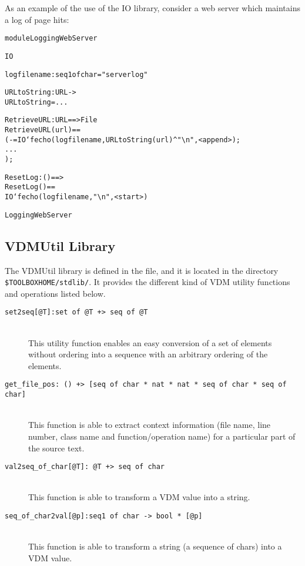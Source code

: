 \documentclass[\pformat,12pt]{article}
\begin{document}
As an example of the use of the IO library, consider a
web server which maintains a log of page hits:

\begin{alltt}
  module LoggingWebServer

       IO 

     


      logfilename : seq1 of char = "serverlog"

      URLtoString : URL ->   
      URLtoString = ...

      RetrieveURL : URL ==> File
      RetrieveURL(url) ==
        ( - = IO`fecho(logfilename, URLtoString(url)^\verb+"\n"+, <append>);
         ... 
        );

      ResetLog : () ==> 
      ResetLog() ==
        IO`fecho(logfilename,\verb+"\n"+,<start>)

   LoggingWebServer
\end{alltt}

\subsection{VDMUtil Library}

The VDMUtil library is defined in the 
 file, and it 
is located 
in the directory \verb+$TOOLBOXHOME/stdlib/+.  
It provides the different kind of VDM utility functions and 
operations listed below. 

\begin{description}
\item[\texttt{set2seq[@T]:set of @T +> seq of @T}] \mbox{}\\
This utility function enables an easy conversion of a set of elements without 
ordering into a sequence with an arbitrary ordering of the elements.
\item[\texttt{get\_file\_pos: () +> [seq of char * nat * nat * seq of char * seq of char]}] \mbox{}\\
This function is able to extract context information (file name, line 
number, class name and function/operation name) for a particular part 
of the source text.
\item[\texttt{val2seq\_of\_char[@T]: @T +> seq of char}] \mbox{}\\
This function is able to transform a VDM value into a string.
\item[\texttt{seq\_of\_char2val[@p]:seq1 of char -> bool * [@p]}] \mbox{}\\
This function is able to transform a string (a sequence of chars) into 
a VDM value.
\end{description}
\end{document}
